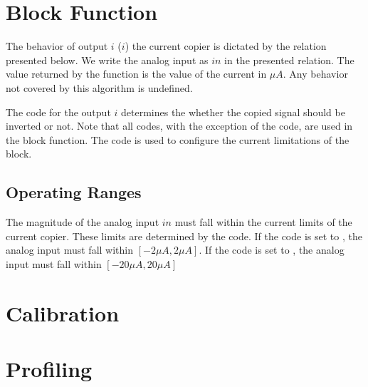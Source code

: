   
\section{Block Function}\label{fanout:blockfun}
The behavior of output $i$ ($i$) the current copier is dictated by the
relation presented below. We write the analog input as $in$ in the presented
relation. The value returned by the function is the value of the current in $\mu
A$. Any behavior not covered by this algorithm is undefined.

\begin{algorithmic}
  \EndIf
\end{algorithmic}

The  code for the output $i$ determines the whether the copied signal
should be inverted or not. Note that all \static codes, with the exception of
the  code, are used in the block function. The  code is
used to configure the current limitations of the block.

\subsection{Operating Ranges}

The magnitude of the analog input $in$ must fall within the current limits of
the current copier. These limits are determined by the  code. If the
 code is set to , the analog input must fall within
$[-2 \mu A, 2 \mu A]$. If the  code is set to , the
analog input must fall within $[-20 \mu A, 20 \mu A]$

\section{Calibration}\label{fanout:calib}


\begin{algorithmic}
    \EndFor
    \EndFor
    \EndFor
    \EndFor
\end{algorithmic}

\section{Profiling}\label{fanout:calib}